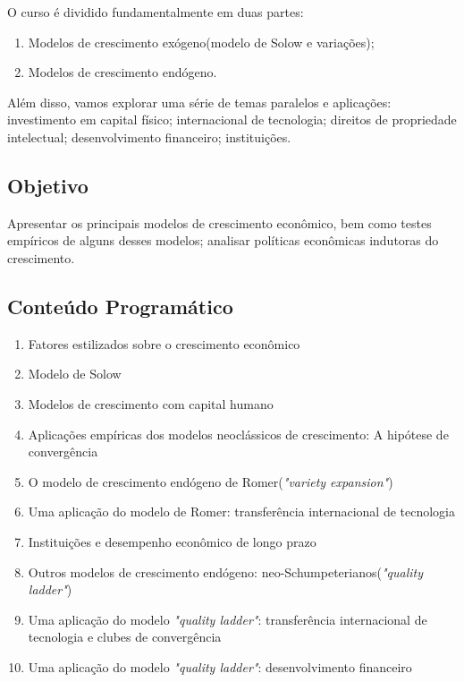 \documentclass[a4paper,12pt]{article}[abntex2]
\begin{document}
O curso é dividido fundamentalmente em duas partes: \begin{enumerate}
    \item Modelos de crescimento exógeno(modelo de Solow e variações);
    \item Modelos de crescimento endógeno.
\end{enumerate}

Além disso, vamos explorar uma série de temas paralelos e aplicações: investimento em capital físico; internacional de tecnologia; direitos de propriedade intelectual; desenvolvimento financeiro; instituições.

\subsection*{\textbf{Objetivo}}

Apresentar os principais modelos de crescimento econômico, bem como testes empíricos de alguns desses modelos; analisar políticas econômicas indutoras do crescimento. 

\subsection*{\textbf{Conteúdo Programático}}

\begin{enumerate}
    \item Fatores estilizados sobre o crescimento econômico
    \item Modelo de Solow
    \item Modelos de crescimento com capital humano
    \item Aplicações empíricas dos modelos neoclássicos de crescimento: A hipótese de convergência 
    \item O modelo de crescimento endógeno de Romer(\textit{"variety expansion"})
    \item Uma aplicação do modelo de Romer: transferência internacional de tecnologia
    \item Instituições e desempenho econômico de longo prazo
    \item Outros modelos de crescimento endógeno: neo-Schumpeterianos(\textit{"quality ladder"})
    \item Uma aplicação do modelo \textit{"quality ladder"}: transferência internacional de tecnologia e clubes de convergência
    \item Uma aplicação do modelo \textit{"quality ladder"}: desenvolvimento financeiro
\end{enumerate}
\end{document}
